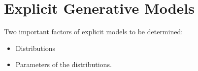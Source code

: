 \chapter{Explicit Generative Models}
Two important factors of explicit models to be determined:
\begin{itemize}
	\item Distributions
	\item Parameters of the distributions.
\end{itemize}
